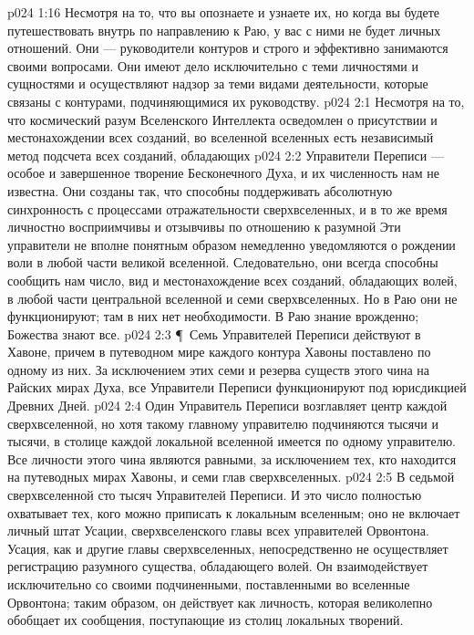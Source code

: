 \vs p024 1:16 Несмотря на то, что вы опознаете и узнаете их, но когда вы будете путешествовать внутрь по направлению к Раю, у вас с ними не будет личных отношений. Они --- руководители контуров и строго и эффективно занимаются своими вопросами. Они имеют дело исключительно с теми личностями и сущностями и осуществляют надзор за теми видами деятельности, которые связаны с контурами, подчиняющимися их руководству.
\vs p024 2:1 Несмотря на то, что космический разум Вселенского Интеллекта осведомлен о присутствии и местонахождении всех  созданий, во вселенной вселенных есть независимый метод подсчета всех созданий, обладающих 
\vs p024 2:2 Управители Переписи --- особое и завершенное творение Бесконечного Духа, и их численность нам не известна. Они созданы так, что способны поддерживать абсолютную синхронность с процессами отражательности сверхвселенных, и в то же время личностно восприимчивы и отзывчивы по отношению к разумной  Эти управители не вполне понятным образом немедленно уведомляются о рождении воли в любой части великой вселенной. Следовательно, они всегда способны сообщить нам число, вид и местонахождение всех созданий, обладающих волей, в любой части центральной вселенной и семи сверхвселенных. Но в Раю они не функционируют; там в них нет необходимости. В Раю знание врожденно; Божества знают все.
\vs p024 2:3 \P\ Семь Управителей Переписи действуют в Хавоне, причем в путеводном мире каждого контура Хавоны поставлено по одному из них. За исключением этих семи и резерва существ этого чина на Райских мирах Духа, все Управители Переписи функционируют под юрисдикцией Древних Дней.
\vs p024 2:4 Один Управитель Переписи возглавляет центр каждой сверхвселенной, но хотя такому главному управителю подчиняются тысячи и тысячи, в столице каждой локальной вселенной имеется по одному управителю. Все личности этого чина являются равными, за исключением тех, кто находится на путеводных мирах Хавоны, и семи глав сверхвселенных.
\vs p024 2:5 В седьмой сверхвселенной сто тысяч Управителей Переписи. И это число полностью охватывает тех, кого можно приписать к локальным вселенным; оно не включает личный штат Усации, сверхвселенского главы всех управителей Орвонтона. Усация, как и другие главы сверхвселенных, непосредственно не осуществляет регистрацию разумного существа, обладающего волей. Он взаимодействует исключительно со своими подчиненными, поставленными во вселенные Орвонтона; таким образом, он действует как личность, которая великолепно обобщает их сообщения, поступающие из столиц локальных творений.
